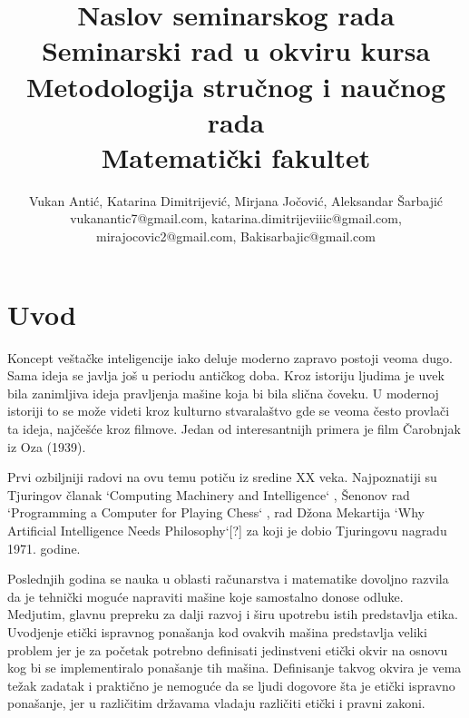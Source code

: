 \documentclass[a4paper]{article}
\begin{document}
\title{Naslov seminarskog rada\\ \small{Seminarski rad u okviru kursa\\Metodologija stručnog i naučnog rada\\ Matematički fakultet}}

\author{Vukan Antić, Katarina Dimitrijević, Mirjana Jočović, Aleksandar Šarbajić \\ vukanantic7@gmail.com, katarina.dimitrijeviiic@gmail.com, \\ mirajocovic2@gmail.com, Bakisarbajic@gmail.com}


\maketitle


\tableofcontents

\newpage

\section{Uvod}
\label{sec:uvod}


Koncept veštačke inteligencije iako deluje moderno zapravo postoji veoma dugo. Sama ideja se javlja još u periodu antičkog doba. Kroz istoriju ljudima je uvek bila zanimljiva ideja pravljenja mašine koja bi bila slična čoveku. U modernoj istoriji to se može videti kroz kulturno stvaralaštvo gde se veoma često provlači ta ideja, najčešće kroz filmove. Jedan od interesantnijh primera je film Čarobnjak iz Oza (1939).

Prvi ozbiljniji radovi na ovu temu potiču iz sredine XX veka. Najpoznatiji su Tjuringov članak `Computing Machinery and Intelligence` \cite{turing_compting}, Šenonov rad `Programming a Computer for Playing Chess` \cite{senon_sah}, rad Džona Mekartija `Why Artificial Intelligence Needs Philosophy`[?] za koji je dobio Tjuringovu nagradu 1971. godine. 

Poslednjih godina se nauka u oblasti računarstva i matematike dovoljno razvila da je tehnički moguće napraviti mašine koje samostalno donose odluke. Medjutim, glavnu prepreku za dalji razvoj i širu upotrebu istih predstavlja etika. Uvodjenje etički ispravnog ponašanja kod ovakvih mašina predstavlja veliki problem jer je za početak potrebno definisati jedinstveni etički okvir na osnovu kog bi se implementiralo ponašanje tih mašina. Definisanje takvog okvira je vema težak zadatak i praktično je nemoguće da se ljudi dogovore šta je etički ispravno ponašanje, jer u različitim državama vladaju različiti etički i pravni zakoni.
\end{document}
